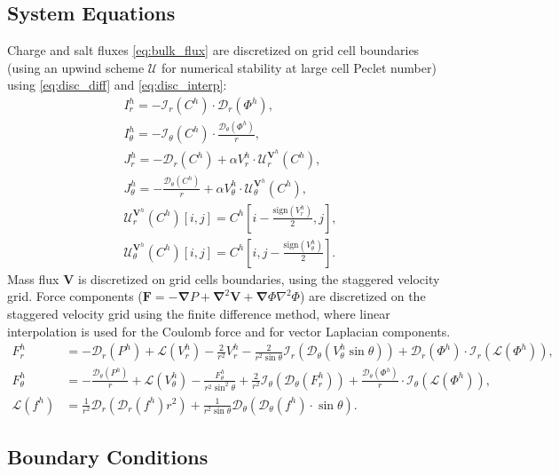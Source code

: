 \documentclass[MSc,beforeExam]{iitcsthesis}
\newcommand{\sign}{\ensuremath{\mathrm{sign}}}
\newcommand{\pars}[1]{\left(#1\right)}
\newcommand\Laplacian{\nabla^2}
\newcommand\bnabla{\boldsymbol{\nabla}}
\newcommand\bLaplacian{\boldsymbol{\nabla}^2}
\newcommand\bV{\boldsymbol{V}}
\newcommand\bF{\boldsymbol{F}}
\newcommand\cI{\mathcal{I}}
\newcommand\cD{\mathcal{D}}
\newcommand\cL{\mathcal{L}}
\begin{document}
\subsection{System Equations} \label{sec:disc_equations}
Charge and salt fluxes \eqref{eq:bulk_flux} are discretized on grid cell boundaries 
(using an upwind scheme $\mathcal{U}$ for numerical stability at large cell Peclet number)  
using \eqref{eq:disc_diff} and \eqref{eq:disc_interp}:
\begin{align} 
\nonumber
I^h_r = -\cI_r(C^h) \cdot \cD_r(\varPhi^h), \\
\nonumber
I^h_\theta = -\cI_\theta(C^h) \cdot \frac{\cD_\theta(\varPhi^h)}{r}, \\
\nonumber
J^h_r = -\cD_r(C^h) + \alpha V^h_r \cdot \mathcal{U}^{\bV^h}_r (C^h), \\
J^h_\theta = -\frac{\cD_\theta(C^h)}{r} + \alpha V^h_\theta \cdot \mathcal{U}^{\bV^h}_\theta (C^h), 
\\ \nonumber
 \mathcal{U}^{\bV^h}_r(C^h)[i,j] = C^h\left[i-\frac{\sign(V^h_r)}{2}, j\right], 
\\ \nonumber
 \mathcal{U}^{\bV^h}_\theta(C^h)[i,j] = C^h\left[i, j-\frac{\sign(V^h_\theta)}{2}\right]. 
\end{align}
Mass flux $\bV$ is discretized on grid cells boundaries, 
using the staggered velocity grid.
Force components ($\bF = -\bnabla P + \bLaplacian \bV + \bnabla \varPhi \Laplacian \varPhi$) 
are discretized on the staggered velocity grid using the finite difference
method, where linear interpolation is used for the Coulomb force and 
for vector Laplacian components.
\begin{align}
\nonumber
F^h_r &= -\cD_r(P^h) 
          + \cL(V^h_r) - \frac{2}{r^2} V^h_r 
		  - \frac{2}{r^2 \sin\theta} \cI_r(\cD_\theta (V^h_\theta \sin\theta))
          + \cD_r(\varPhi^h) \cdot \cI_r(\cL(\varPhi^h)), \\
\nonumber
F^h_\theta &= -\frac{\cD_\theta(P^h)}{r} 
		  + \cL(V^h_\theta) - \frac{F^h_\theta}{r^2 \sin^2\theta} 
		  + \frac{2}{r^2} \cI_\theta(\cD_\theta(F^h_r))
		  + \frac{\cD_\theta(\varPhi^h)}{r} \cdot \cI_\theta(\cL(\varPhi^h)), \\
\cL(f^h) &= \frac{1}{r^2}\cD_r\pars{\cD_r(f^h) r^2} + 
\frac{1}{r^2 \sin\theta} \cD_\theta\pars{\cD_\theta(f^h) \cdot \sin\theta}.
\end{align}


\subsection{Boundary Conditions} \label{sec:disc_boundary}
\end{document}
